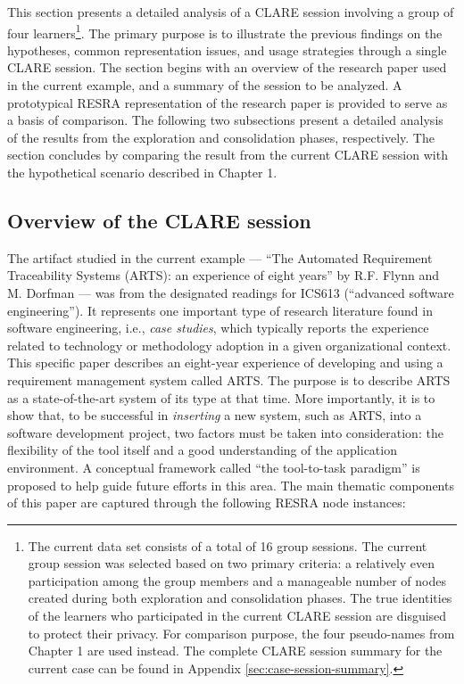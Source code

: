 This section presents a detailed analysis of a CLARE session involving a
group of four learners\footnote{The current data set consists of a total of
16 group sessions. The current group session was selected based on two
primary criteria: a relatively even participation among the group members
and a manageable number of nodes created during both exploration and
consolidation phases. The true identities of the learners who participated
in the current CLARE session are disguised to protect their privacy. For
comparison purpose, the four pseudo-names from Chapter 1 are used
instead. The complete CLARE session summary for the current case can be
found in Appendix \ref{sec:case-session-summary}.}. The primary purpose is
to illustrate the previous findings on the hypotheses, common
representation issues, and usage strategies through a single CLARE
session. The section begins with an overview of the research paper used in
the current example, and a summary of the session to be analyzed.  A
prototypical RESRA representation of the research paper is provided to
serve as a basis of comparison. The following two subsections present a
detailed analysis of the results from the exploration and consolidation
phases, respectively. The section concludes by comparing the result from
the current CLARE session with the hypothetical scenario described in
Chapter 1.


\subsection{Overview of the CLARE session}
\label{sec:case-overview}

The artifact studied in the current example --- ``The Automated Requirement
Traceability Systems (ARTS): an experience of eight years'' by R.F. Flynn
and M. Dorfman \cite{Flynn90} --- was from the designated readings for
ICS613 (``advanced software engineering''). It represents one important
type of research literature found in software engineering, i.e., {\it case
studies\/}, which typically reports the experience related to technology or
methodology adoption in a given organizational context. This specific paper
describes an eight-year experience of developing and using a requirement
management system called ARTS. The purpose is to describe ARTS as a
state-of-the-art system of its type at that time. More importantly, it is
to show that, to be successful in {\it inserting\/} a new system, such as
ARTS, into a software development project, two factors must be taken into
consideration: the flexibility of the tool itself and a good understanding
of the application environment. A conceptual framework called ``the
tool-to-task paradigm'' is proposed to help guide future efforts in this
area. The main thematic components of this paper are captured through the
following RESRA node instances:


